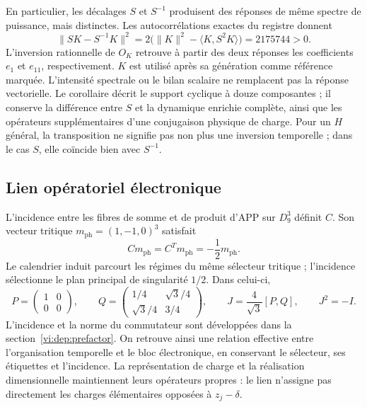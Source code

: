 En particulier, les décalages $S$ et $S^{-1}$ produisent des réponses de
même spectre de puissance, mais distinctes. Les autocorrélations exactes
du registre donnent
\begin{equation}
 \|SK-S^{-1}K\|^2
 =2\bigl(\|K\|^2-\langle K,S^2K\rangle\bigr)
 =2175744>0.
 \label{md:cron:separacion-desplazamientos}
\end{equation}
L’inversion rationnelle de $O_K$ retrouve à partir des deux réponses les
coefficients $e_1$ et $e_{11}$, respectivement. $K$ est utilisé après
sa génération comme référence marquée. L’intensité spectrale ou le
bilan scalaire ne remplacent pas la réponse vectorielle.
Le corollaire décrit le support cyclique à douze composantes ;
il conserve la différence entre $S$ et la dynamique enrichie complète,
ainsi que les opérateurs supplémentaires d’une conjugaison physique de charge.
Pour un $H$ général, la transposition ne signifie pas non plus une inversion temporelle ;
dans le cas $S$, elle coïncide bien avec $S^{-1}$.

\subsection{Lien opératoriel électronique}
\label{md:cron:electron}

L’incidence entre les fibres de somme et de produit d’APP sur $D_9^3$
définit $C$. Son vecteur tritique
$m_{\mathrm{ph}}=(1,-1,0)^3$ satisfait
\begin{equation}
 Cm_{\mathrm{ph}}=C^Tm_{\mathrm{ph}}
 =-\frac12m_{\mathrm{ph}}.
 \label{md:cron:modo-tritico}
\end{equation}
Le calendrier induit parcourt les régimes du même sélecteur tritique ;
l’incidence sélectionne le plan principal de singularité $1/2$.
Dans celui-ci,
\begin{equation}
 P=\begin{pmatrix}1&0\\0&0\end{pmatrix},\qquad
 Q=\begin{pmatrix}1/4&\sqrt3/4\\\sqrt3/4&3/4\end{pmatrix},
 \qquad J=\frac4{\sqrt3}[P,Q],\qquad J^2=-I.
 \label{md:cron:plano-electronico}
\end{equation}
L’incidence et la norme du commutateur sont développées dans la
section~\ref{vi:dep:prefactor}. On retrouve ainsi une relation effective entre
l’organisation temporelle et le bloc électronique, en conservant le sélecteur,
ses étiquettes et l’incidence. La représentation de charge et la réalisation
dimensionnelle maintiennent leurs opérateurs propres : le lien n’assigne pas
directement les charges élémentaires opposées à $z_j-\delta$.

